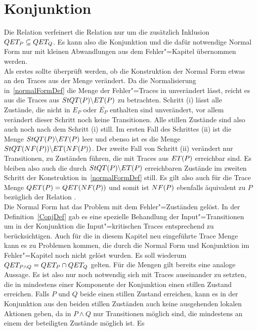 \section{Konjunktion}

Die Relation \QRel{} verfeinert die Relation \ERel{} nur um die zusätzlich
Inklusion $QET _P \subseteq QET _Q$. Es kann also die Konjunktion und die
dafür notwendige Normal Form nur mit kleinen Abwandlungen aus dem
Fehler"=Kapitel übernommen werden.\\
Als erstes sollte überprüft werden, ob die Konstruktion der Normal Form etwas
an den Traces aus der Menge \QET{} verändert. Da die Normalisierung
in~\ref{normalFormDef} die Menge der Fehler"=Traces in \ET{} unverändert lässt,
reicht es aus die Traces aus $StQT (P)\backslash ET (P)$ zu betrachten.
Schritt (i) lässt alle Zustände, die nicht in $E_P$ oder $\overline{E_P}$
enthalten sind unverändert, vor allem verändert dieser Schritt noch keine
Transitionen. Alle stillen Zustände sind also auch noch nach dem Schritt (i)
still. Im ersten Fall des Schrittes (ii) ist die Menge $StQT (P)\backslash ET
(P)$ leer und ebenso ist es die Menge $StQT (NF (P))\backslash ET (NF (P))$.
Der zweite Fall von Schritt (ii) verändert nur Transitionen, zu Zuständen
führen, die mit Traces aus $ET (P)$ erreichbar sind. Es bleiben also auch die
durch $StQT (P)\backslash ET (P)$ erreichbaren Zustände im zweiten Schritt
der Konstruktion in~\ref{normalFormDef} still. Es gilt also auch für die Trace
Menge \QET{} $QET(P) = QET (NF (P))$ und somit ist $NF (P)$ ebenfalls
äquivalent zu $P$ bezüglich der Relation \QRel{}.\\
Die Normal Form hat das Problem mit dem Fehler"=Zuständen gelöst. In der
Definition~\ref{ConjDef} gab es eine spezielle Behandlung der
Input"=Transitionen um in der Konjunktion die Input"=kritischen Traces
entsprechend zu berücksichtigen. Auch für die in diesem Kapitel neu eingeführte
Trace Menge \QET{} kann es zu Problemen kommen, die durch die Normal Form und
Konjunktion im Fehler"=Kapitel noch nicht gelöst wurden. Es soll wiederum $QET
_{P\land Q} = QET _P \cap QET _Q$ gelten. Für die \ET{} Mengen gilt bereits
eine analoge Aussage. Es ist also nur noch notwendig sich mit Traces
auseinander zu setzten, die in mindestens einer Komponente der Konjunktion
einen stillen Zustand erreichen. Falls $P$ und $Q$ beide einen stillen Zustand
erreichen, kann es in der Konjunktion aus den beiden stillen Zuständen auch
keine ausgehenden lokalen Aktionen geben, da in $P\land Q$ nur Transitionen
möglich sind, die mindestens an einem der beteiligten Zustände möglich ist. Es

